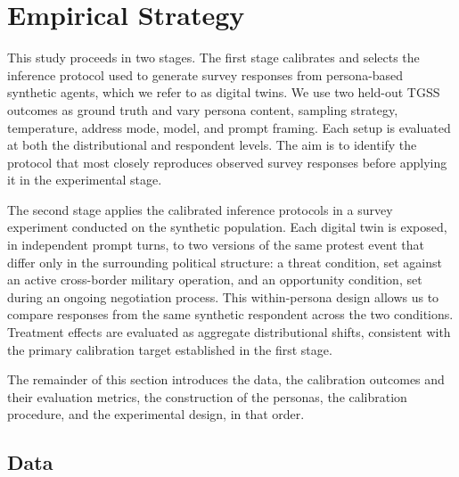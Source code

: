 
\section{Empirical Strategy}
\label{sec:empirical-strategy}

This study proceeds in two stages. The first stage calibrates and selects
the inference protocol used to generate survey responses from persona-based
synthetic agents, which we refer to as digital twins. We use two held-out
TGSS outcomes as ground truth and vary persona content, sampling strategy,
temperature, address mode, model, and prompt framing. Each setup is
evaluated at both the distributional and respondent levels. The aim is to
identify the protocol that most closely reproduces observed survey
responses before applying it in the experimental stage.

The second stage applies the calibrated inference protocols in a survey
experiment conducted on the synthetic population. Each digital twin is
exposed, in independent prompt turns, to two versions of the same protest
event that differ only in the surrounding political structure: a threat
condition, set against an active cross-border military operation, and an
opportunity condition, set during an ongoing negotiation process. This
within-persona design allows us to compare responses from the same
synthetic respondent across the two conditions. Treatment effects are
evaluated as aggregate distributional shifts, consistent with the primary
calibration target established in the first stage.

The remainder of this section introduces the data, the calibration outcomes
and their evaluation metrics, the construction of the personas, the
calibration procedure, and the experimental design, in that order.

\subsection{Data}
\label{sec:data}


